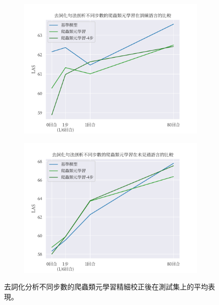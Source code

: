 \begin{figure}[htbp]
    \centering
    \begin{subfigure}[t]{\textwidth}
        \centering
        \includegraphics[width=390pt]{figs/chapter3/delex/delex_reptile_train_langs.pdf}
    \end{subfigure}
    \vspace{-12pt}
    \begin{subfigure}[t]{\textwidth}
        \centering
        \includegraphics[width=390pt]{figs/chapter3/delex/delex_reptile_test_langs.pdf}
    \end{subfigure}
    \caption{去詞化分析不同步數的爬蟲類元學習精細校正後在測試集上的平均表現。}
    \label{fig:delex_avg}
\end{figure}